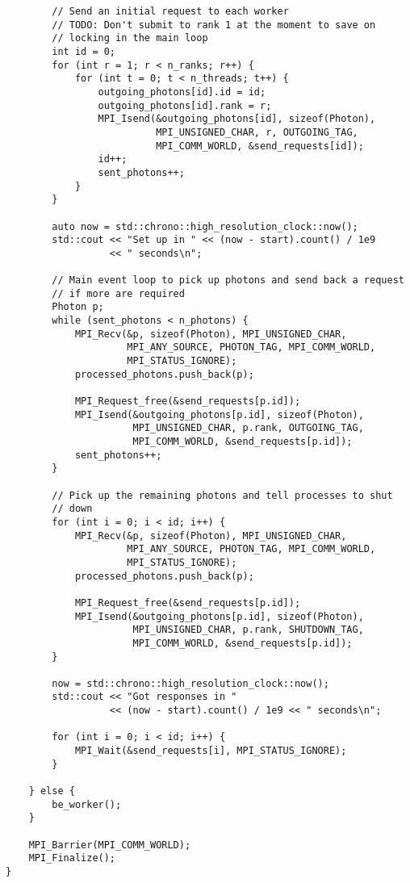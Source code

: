 \begin{lstlisting}
        // Send an initial request to each worker
        // TODO: Don't submit to rank 1 at the moment to save on
        // locking in the main loop
        int id = 0;
        for (int r = 1; r < n_ranks; r++) {
            for (int t = 0; t < n_threads; t++) {
                outgoing_photons[id].id = id;
                outgoing_photons[id].rank = r;
                MPI_Isend(&outgoing_photons[id], sizeof(Photon),
                          MPI_UNSIGNED_CHAR, r, OUTGOING_TAG,
                          MPI_COMM_WORLD, &send_requests[id]);
                id++;
                sent_photons++;
            }
        }

        auto now = std::chrono::high_resolution_clock::now();
        std::cout << "Set up in " << (now - start).count() / 1e9
                  << " seconds\n";

        // Main event loop to pick up photons and send back a request
        // if more are required
        Photon p;
        while (sent_photons < n_photons) {
            MPI_Recv(&p, sizeof(Photon), MPI_UNSIGNED_CHAR,
                     MPI_ANY_SOURCE, PHOTON_TAG, MPI_COMM_WORLD,
                     MPI_STATUS_IGNORE);
            processed_photons.push_back(p);

            MPI_Request_free(&send_requests[p.id]);
            MPI_Isend(&outgoing_photons[p.id], sizeof(Photon),
                      MPI_UNSIGNED_CHAR, p.rank, OUTGOING_TAG,
                      MPI_COMM_WORLD, &send_requests[p.id]);
            sent_photons++;
        }

        // Pick up the remaining photons and tell processes to shut
        // down
        for (int i = 0; i < id; i++) {
            MPI_Recv(&p, sizeof(Photon), MPI_UNSIGNED_CHAR,
                     MPI_ANY_SOURCE, PHOTON_TAG, MPI_COMM_WORLD,
                     MPI_STATUS_IGNORE);
            processed_photons.push_back(p);

            MPI_Request_free(&send_requests[p.id]);
            MPI_Isend(&outgoing_photons[p.id], sizeof(Photon),
                      MPI_UNSIGNED_CHAR, p.rank, SHUTDOWN_TAG,
                      MPI_COMM_WORLD, &send_requests[p.id]);
        }

        now = std::chrono::high_resolution_clock::now();
        std::cout << "Got responses in "
                  << (now - start).count() / 1e9 << " seconds\n";

        for (int i = 0; i < id; i++) {
            MPI_Wait(&send_requests[i], MPI_STATUS_IGNORE);
        }

    } else {
        be_worker();
    }

    MPI_Barrier(MPI_COMM_WORLD);
    MPI_Finalize();
}
\end{lstlisting}
